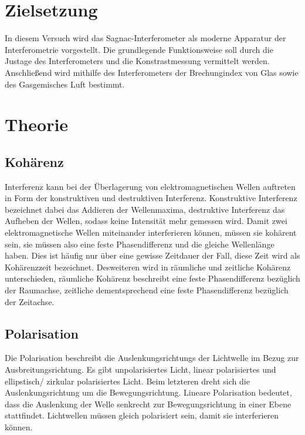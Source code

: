 \section{Zielsetzung}
\label{sec:Ziel} 
\noindent
In diesem Versuch wird das Sagnac-Interferometer als moderne Apparatur der Interferometrie vorgestellt. Die grundlegende Funktionsweise soll durch die Justage des Interferometers 
und die Konstrastmessung vermittelt werden. Anschließend wird mithilfe des Interferometers der Brechungindex von Glas sowie des Gasgemisches Luft bestimmt. 

\section{Theorie}
\label{sec:Theorie}


\subsection{Kohärenz}

\noindent Interferenz kann bei der Überlagerung von elektromagnetischen Wellen auftreten in Form der konstruktiven und destruktiven Interferenz. Konstruktive Interferenz bezeichnet dabei das
Addieren der Wellenmaxima, destruktive Interferenz das Aufheben der Wellen, sodass keine Intensität mehr gemessen wird. Damit zwei elektromagnetische Wellen miteinander interferieren können, 
müssen sie kohärent sein, sie müssen also eine feste Phasendifferenz und die gleiche Wellenlänge haben. Dies ist häufig nur über eine gewisse Zeitdauer der Fall, diese Zeit wird als 
Kohärenzzeit bezeichnet. Desweiteren wird in räumliche und zeitliche Kohärenz unterschieden, räumliche Kohärenz beschreibt eine feste Phasendifferenz bezüglich der Raumachse, zeitliche 
dementsprechend eine feste Phasendifferenz bezüglich der Zeitachse. 


\subsection{Polarisation}

\noindent Die Polarisation beschreibt die Auslenkungsrichtungs der Lichtwelle im Bezug zur Ausbreitungsrichtung. Es gibt unpolarisiertes Licht, linear polarisiertes und ellipstisch/
zirkular polarisiertes Licht. Beim letzteren dreht sich die Auslenkungsrichtung um die Bewegungsrichtung. Lineare Polarisation bedeutet, dass die Auslenkung der Welle senkrecht zur 
Bewegungsrichtung in einer Ebene stattfindet. Lichtwellen müssen gleich polarisiert sein, damit sie interferieren können. 


